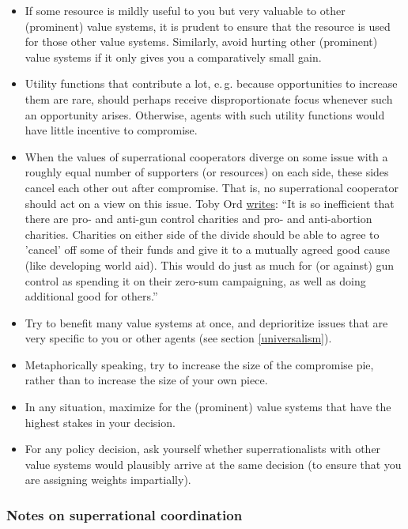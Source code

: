 \begin{itemize}
\item
  If some resource is mildly useful to you but very valuable to other
  (prominent) value systems, it is prudent to ensure that the resource
  is used for those other value systems. Similarly, avoid hurting other
  (prominent) value systems if it only gives you a comparatively small
  gain.
\item
  Utility functions that contribute a lot, e.\,g. because opportunities to
  increase them are rare, should perhaps receive disproportionate focus
  whenever such an opportunity arises. Otherwise, agents with such
  utility functions would have little incentive to compromise.
\item
  When the values of superrational cooperators diverge on some issue
  with a roughly equal number of supporters (or resources) on each side,
  these sides cancel each other out after compromise. That is, no
  superrational cooperator should act on a view on this issue. Toby Ord
  \href{http://felicifia.org/viewtopic.php?t=79\#p486}{writes}:
  ``It is so inefficient that there are pro- and anti-gun control
  charities and pro- and anti-abortion charities. Charities on either
  side of the divide should be able to agree to 'cancel' off some of
  their funds and give it to a mutually agreed good cause (like
  developing world aid). This would do just as much for (or against) gun
  control as spending it on their zero-sum campaigning, as well as doing
  additional good for others.''
\item
  Try to benefit many value systems at once, and deprioritize issues
  that are very specific to you or other agents (see section
  \ref{universalism}).
\item
  Metaphorically speaking, try to increase the size of the compromise
  pie, rather than to increase the size of your own piece.
\item
  In any situation, maximize for the (prominent) value systems that have
  the highest stakes in your decision.
\item
  For any policy decision, ask yourself whether superrationalists with
  other value systems would plausibly arrive at the same decision (to
  ensure that you are assigning weights impartially).
\end{itemize}

\hypertarget{notes-on-superrational-coordination}{\subsubsection{Notes
on superrational
coordination}\label{notes-on-superrational-coordination}}

